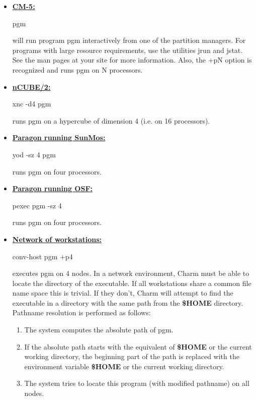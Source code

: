 \begin{itemize}

\item \underline{\bf CM-5:} 
	\begin{tabbing}
	{\fexec pgm}
	\end{tabbing}
	will run program {\fparm pgm} interactively from one of the partition 
	managers.  For programs with large resource requirements, use the utilities
	{\fexec jrun} and {\fexec jstat}. See the man pages at your site for
	more information. Also, the {\fexec +pN} option is recognized and runs {\fexec pgm} on {\fexec N} processors.

\item \underline{\bf nCUBE/2:} 
	\begin{tabbing}
	{\fexec xnc -d4 pgm}
	\end{tabbing}
	runs {\fparm pgm} on a hypercube of dimension 4 (i.e. on 16 processors). 

\item \underline{\bf Paragon running SunMos:} 
	\begin{tabbing}
	{\fexec yod -sz 4 pgm}
	\end{tabbing}
	runs {\fparm pgm} on four processors.

\item \underline{\bf Paragon running OSF:} 
	\begin{tabbing}
	{\fexec pexec pgm -sz 4}
	\end{tabbing}
	runs {\fparm pgm} on four processors.

\item \underline{\bf Network of workstations:} 
	\begin{tabbing}
	{\fexec conv-host pgm +p4}
	\end{tabbing}
	executes {\fparm pgm} on 4 nodes.  In a network environment, Charm must
	be able to locate the directory of the executable.  If all workstations
	share a common file name space this is trivial.  If they don't, Charm
	will attempt to find the executable in a directory with the same path
	from the {\bf \$HOME} directory.  Pathname resolution is performed as 
	follows:
	\begin{enumerate}
		\item The system computes the absolute path of {\fexec pgm}.
		\item If the absolute path starts with the equivalent of {\bf \$HOME} 
			or the current working directory, the beginning part of the path 
			is replaced with the environment variable {\bf \$HOME} or the 
			current working directory.
		\item The system tries to locate this program (with modified 
			pathname) on all nodes.
	\end{enumerate}


\end{itemize}
